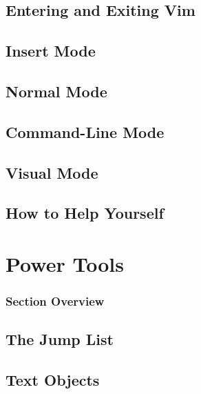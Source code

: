 \documentclass{beamer}
\begin{document}
\subsection{Entering and Exiting Vim}
\begin{frame}
\end{frame}
\subsection{Insert Mode}
\begin{frame}
\end{frame}
\subsection{Normal Mode}
\begin{frame}
\end{frame}
\subsection{Command-Line Mode}
\begin{frame}
\end{frame}
\subsection{Visual Mode}
\begin{frame}
\end{frame}
\subsection{How to Help Yourself}
\begin{frame}
\end{frame}

\section{Power Tools}
\begin{frame}
		\frametitle{Section Overview}
		\tableofcontents[sections=3]
\end{frame}
\subsection{The Jump List}
\begin{frame}
\end{frame}
\subsection{Text Objects}
\begin{frame}
\end{frame}
\end{document}
